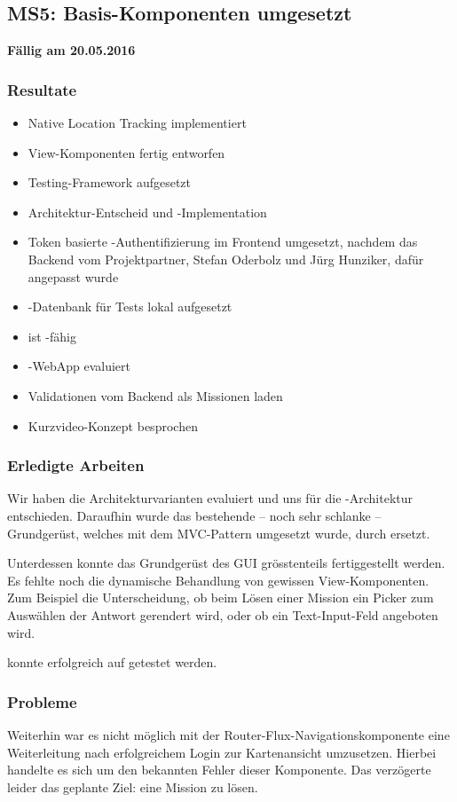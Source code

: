 \subsection{MS5: Basis-Komponenten umgesetzt}
\label{pm-ms5}
\textbf{Fällig am 20.05.2016}
\subsubsection{Resultate}
\begin{itemize}
	\item Native Location Tracking implementiert
	\item View-Komponenten fertig entworfen
	\item Testing-\gls{Framework} aufgesetzt
	\item Architektur-Entscheid und -Implementation
	\item Token basierte -Authentifizierung im Frontend umgesetzt, nachdem das Backend vom Projektpartner, Stefan Oderbolz und Jürg Hunziker, dafür angepasst wurde
	\item \kort{}-Datenbank für Tests lokal aufgesetzt
	\item \kort{} ist -fähig
	\item {}-\gls{WebApp} evaluiert
	\item Validationen vom Backend als Missionen laden
	\item Kurzvideo-Konzept besprochen
\end{itemize}

\subsubsection{Erledigte Arbeiten}

Wir haben die Architekturvarianten evaluiert und uns für die -Architektur entschieden.
Daraufhin wurde das bestehende -- noch sehr schlanke -- Grundgerüst, welches mit dem MVC-Pattern umgesetzt wurde, durch  ersetzt.

Unterdessen konnte das Grundgerüst des \gls{GUI} grösstenteils fertiggestellt werden. 
Es fehlte noch die dynamische Behandlung von gewissen View-Komponenten.
Zum Beispiel die Unterscheidung, ob beim Lösen einer Mission ein Picker zum Auswählen der Antwort gerendert wird, oder ob ein Text-Input-Feld angeboten wird.

\kort{} konnte erfolgreich auf  getestet werden. 

\subsubsection{Probleme}
Weiterhin war es nicht möglich mit der Router-Flux-Navigationskomponente eine Weiterleitung nach erfolgreichem Login zur Kartenansicht umzusetzen.
Hierbei handelte es sich um den bekannten Fehler dieser Komponente.
Das verzögerte leider das geplante Ziel: eine Mission zu lösen.

